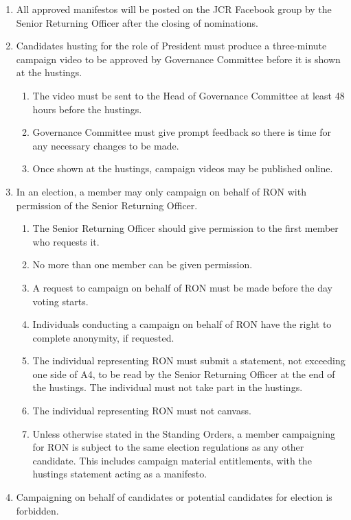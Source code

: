 \documentclass[12pt]{article}
\begin{document}
\begin{enumerate}
\begin{enumerate}
    \end{enumerate}
    \item All approved manifestos will be posted on the JCR Facebook group by the Senior Returning Officer after the closing of nominations.
    \item Candidates husting for the role of President must produce a three-minute campaign video to be approved by Governance Committee before it is shown at the hustings.
    \begin{enumerate}
        \item The video must be sent to the Head of Governance Committee at least 48 hours before the hustings.
        \item Governance Committee must give prompt feedback so there is time for any necessary changes to be made.
        \item Once shown at the hustings, campaign videos may be published online.
    \end{enumerate}
    \item In an election, a member may only campaign on behalf of RON with permission of the Senior Returning Officer.
    \begin{enumerate}
        \item The Senior Returning Officer should give permission to the first member who requests it.
        \item No more than one member can be given permission.
        \item A request to campaign on behalf of RON must be made before the day voting starts.
        \item Individuals conducting a campaign on behalf of RON have the right to complete anonymity, if requested.
        \item The individual representing RON must submit a statement, not exceeding one side of A4, to be read by the Senior Returning Officer at the end of the hustings. The individual must not take part in the hustings.
        \item The individual representing RON must not canvass.
        \item Unless otherwise stated in the Standing Orders, a member campaigning for RON is subject to the same election regulations as any other candidate. This includes campaign material entitlements, with the hustings statement acting as a manifesto.
    \end{enumerate}
    \item Campaigning on behalf of candidates or potential candidates for election is forbidden.
\end{enumerate}
\newpage
\end{document}

